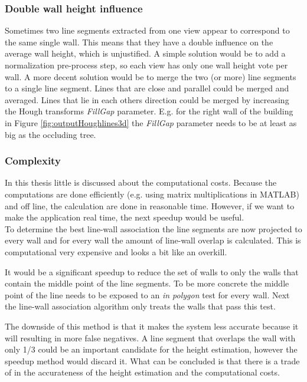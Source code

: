 \subsubsection{Double wall height influence}
Sometimes two line segments extracted from one view appear to correspond to the same single wall. This means that they have a double
influence on the average wall height, which is unjustified. 
A simple solution would be to add a normalization pre-process step, so each view
has only one wall height vote per wall. A more decent solution would be to
merge the two (or more) line segments to a single line segment. 
Lines that are close and parallel could be merged and averaged.
Lines that lie in each others direction could be merged by increasing the 
Hough transforms \emph{FillGap} parameter.  E.g. for the right wall of the building in 
Figure \ref{fig:outputHoughlines3d} the \emph{FillGap} parameter needs to be at
least as big as the occluding tree.

\subsubsection{Complexity}
In this thesis little is discussed about the computational costs. Because the 
computations are done efficiently (e.g. using matrix multiplications
in MATLAB\cite{matlab}) and off line, the calculation are done in reasonable time.
However, if we want to make the application real time, the next speedup would be useful.\\
To determine the best line-wall association the line segments are now projected to
every wall and for every wall the amount of line-wall overlap is calculated. This
is computational very expensive and looks a bit like an overkill.

It would be a significant speedup to reduce the set of walls to only the walls
that contain the middle point of the line segments. To be more concrete the
middle point of the line needs to be exposed to an \emph{in polygon} test for every wall.  Next the
line-wall association algorithm only treats the walls that pass this test.

The downside of this method is that it makes the system less accurate because it
will resulting in more false negatives. A line segment that overlaps the wall
with only 1/3 could be an important candidate for the height estimation, however
the speedup method would discard it.  What can be concluded is that there is a
trade of in the accurateness of the height estimation and the computational
costs.


